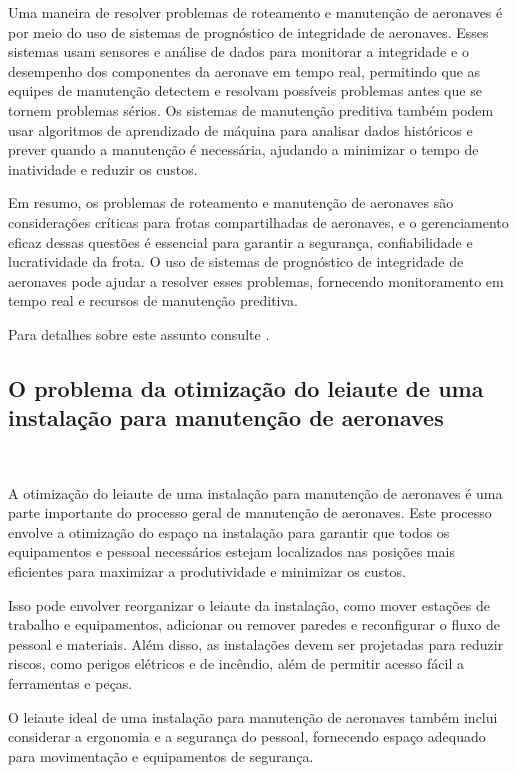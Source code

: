 \documentclass{abntex2}
\begin{document}
\begin{sloppypar}
Uma maneira de resolver problemas de roteamento e manutenção de aeronaves é por meio do uso de sistemas de prognóstico de integridade de aeronaves. Esses sistemas usam sensores e análise de dados para monitorar a integridade e o desempenho dos componentes da aeronave em tempo real, permitindo que as equipes de manutenção detectem e resolvam possíveis problemas antes que se tornem problemas sérios. Os sistemas de manutenção preditiva também podem usar algoritmos de aprendizado de máquina para analisar dados históricos e prever quando a manutenção é necessária, ajudando a minimizar o tempo de inatividade e reduzir os custos.

Em resumo, os problemas de roteamento e manutenção de aeronaves são considerações críticas para frotas compartilhadas de aeronaves, e o gerenciamento eficaz dessas questões é essencial para garantir a segurança, confiabilidade e lucratividade da frota. O uso de sistemas de prognóstico de integridade de aeronaves pode ajudar a resolver esses problemas, fornecendo monitoramento em tempo real e recursos de manutenção preditiva.

Para detalhes sobre este assunto consulte \cite{Eduardo:2022a}.



\subsection{O problema da otimização do leiaute de uma instalação para manutenção de aeronaves}\

A otimização do leiaute de uma instalação para manutenção de aeronaves é uma parte importante do processo geral de manutenção de aeronaves. Este processo envolve a otimização do espaço na instalação para garantir que todos os equipamentos e pessoal necessários estejam localizados nas posições mais eficientes para maximizar a produtividade e minimizar os custos.

Isso pode envolver reorganizar o leiaute da instalação, como mover estações de trabalho e equipamentos, adicionar ou remover paredes e reconfigurar o fluxo de pessoal e materiais. Além disso, as instalações devem ser projetadas para reduzir riscos, como perigos elétricos e de incêndio, além de permitir acesso fácil a ferramentas e peças.

O leiaute ideal de uma instalação para manutenção de aeronaves também inclui considerar a ergonomia e a segurança do pessoal, fornecendo espaço adequado para movimentação e equipamentos de segurança.


\end{sloppypar}
\end{document}
